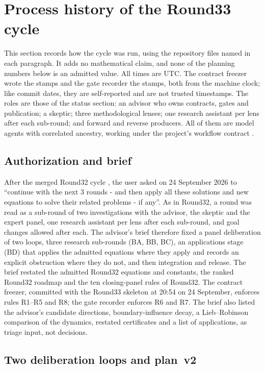 \section{Process history of the Round33 cycle}
\label{sec:history}

This section records how the cycle was run, using the repository files named
in each paragraph. It adds no mathematical claim, and none of the planning
numbers below is an admitted value. All times are UTC. The contract freezer
wrote the  stamps and the gate recorder the
 stamps, both from the machine clock; like commit
dates, they are self-reported and are not trusted timestamps. The roles are
those of the status section: an advisor who owns contracts, gates and
publication; a skeptic; three methodological lenses; one research assistant
per lens after each sub-round; and forward and reverse producers. All of them
are model agents with correlated ancestry, working under the project's
workflow contract \cite{agents}.

\subsection{Authorization and brief}
\label{sec:history-brief}
After the merged Round32 cycle \cite{r32add}, the user asked on 24 September
2026 to ``continue with the next 3 rounds - and then apply all these
solutions and new equations to solve their related problems - if any''. As in
Round32, a round was read as a sub-round of two investigations with the
advisor, the skeptic and the expert panel, one research assistant per lens
after each sub-round, and goal changes allowed after each. The advisor's
brief \cite{r33panel} therefore fixed a panel deliberation of two loops, three
research sub-rounds (BA, BB, BC), an applications stage (BD) that applies the
admitted equations where they apply and records an explicit obstruction where
they do not, and then integration and release. The brief restated the
admitted Round32 equations and constants, the ranked Round32 roadmap and the
ten closing-panel rules of Round32. The contract freezer, committed with the
Round33 skeleton at 20:54 on 24 September, enforces rules R1--R5 and R8; the
gate recorder enforces R6 and R7. The brief also listed the advisor's
candidate directions, boundary-influence decay, a Lieb--Robinson comparison
of the dynamics, restated certificates and a list of applications, as
triage input, not decisions.

\subsection{Two deliberation loops and plan~v2}
\label{sec:history-loops}

